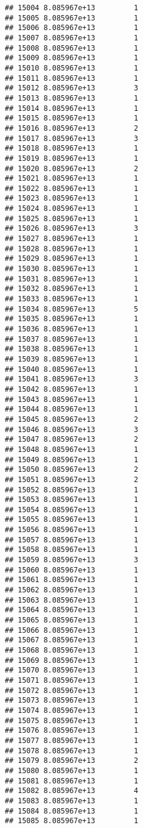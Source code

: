 \documentclass[
]{article}
\begin{document}
\begin{verbatim}
## 15004 8.085967e+13         1
## 15005 8.085967e+13         1
## 15006 8.085967e+13         1
## 15007 8.085967e+13         1
## 15008 8.085967e+13         1
## 15009 8.085967e+13         1
## 15010 8.085967e+13         1
## 15011 8.085967e+13         1
## 15012 8.085967e+13         3
## 15013 8.085967e+13         1
## 15014 8.085967e+13         1
## 15015 8.085967e+13         1
## 15016 8.085967e+13         2
## 15017 8.085967e+13         3
## 15018 8.085967e+13         1
## 15019 8.085967e+13         1
## 15020 8.085967e+13         2
## 15021 8.085967e+13         1
## 15022 8.085967e+13         1
## 15023 8.085967e+13         1
## 15024 8.085967e+13         1
## 15025 8.085967e+13         1
## 15026 8.085967e+13         3
## 15027 8.085967e+13         1
## 15028 8.085967e+13         1
## 15029 8.085967e+13         1
## 15030 8.085967e+13         1
## 15031 8.085967e+13         1
## 15032 8.085967e+13         1
## 15033 8.085967e+13         1
## 15034 8.085967e+13         5
## 15035 8.085967e+13         1
## 15036 8.085967e+13         1
## 15037 8.085967e+13         1
## 15038 8.085967e+13         1
## 15039 8.085967e+13         1
## 15040 8.085967e+13         1
## 15041 8.085967e+13         3
## 15042 8.085967e+13         1
## 15043 8.085967e+13         1
## 15044 8.085967e+13         1
## 15045 8.085967e+13         2
## 15046 8.085967e+13         3
## 15047 8.085967e+13         2
## 15048 8.085967e+13         1
## 15049 8.085967e+13         1
## 15050 8.085967e+13         2
## 15051 8.085967e+13         2
## 15052 8.085967e+13         1
## 15053 8.085967e+13         1
## 15054 8.085967e+13         1
## 15055 8.085967e+13         1
## 15056 8.085967e+13         1
## 15057 8.085967e+13         1
## 15058 8.085967e+13         1
## 15059 8.085967e+13         3
## 15060 8.085967e+13         1
## 15061 8.085967e+13         1
## 15062 8.085967e+13         1
## 15063 8.085967e+13         1
## 15064 8.085967e+13         1
## 15065 8.085967e+13         1
## 15066 8.085967e+13         1
## 15067 8.085967e+13         1
## 15068 8.085967e+13         1
## 15069 8.085967e+13         1
## 15070 8.085967e+13         1
## 15071 8.085967e+13         1
## 15072 8.085967e+13         1
## 15073 8.085967e+13         1
## 15074 8.085967e+13         1
## 15075 8.085967e+13         1
## 15076 8.085967e+13         1
## 15077 8.085967e+13         1
## 15078 8.085967e+13         1
## 15079 8.085967e+13         2
## 15080 8.085967e+13         1
## 15081 8.085967e+13         1
## 15082 8.085967e+13         4
## 15083 8.085967e+13         1
## 15084 8.085967e+13         1
## 15085 8.085967e+13         1

\end{verbatim}
\end{document}
